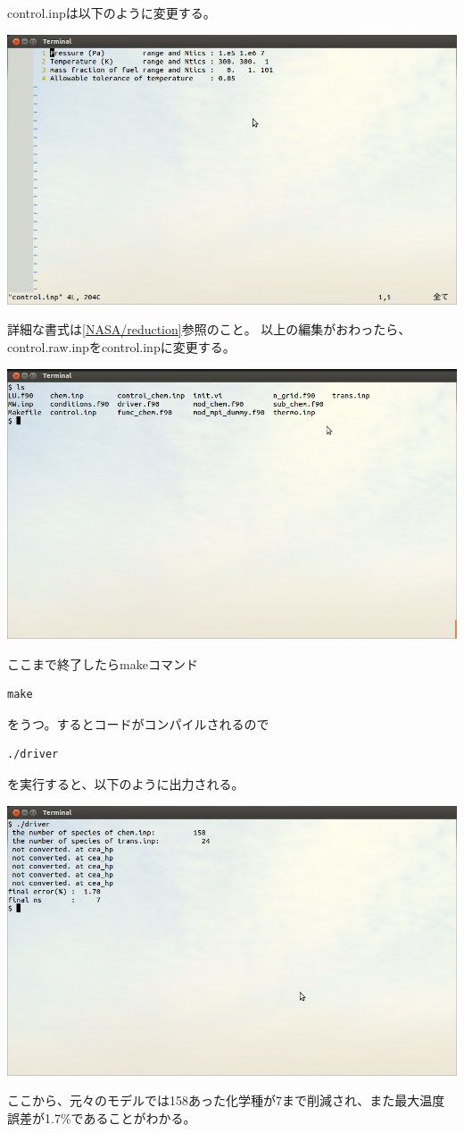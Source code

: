 \documentclass{jsarticle}
\begin{document}
control.inpは以下のように変更する。
\begin{center}
\includegraphics[width=.8\textwidth,bb=0 0 962 577]{tutorial_img/095.png}
\end{center}
詳細な書式は\ref{NASA/reduction}参照のこと。
以上の編集がおわったら、control.raw.inpをcontrol.inpに変更する。
\begin{center}
\includegraphics[width=.8\textwidth,bb=0 0 962 577]{tutorial_img/100.png}
\end{center}
ここまで終了したらmakeコマンド
\begin{verbatim}
make
\end{verbatim}
をうつ。するとコードがコンパイルされるので
\begin{verbatim}
./driver
\end{verbatim}
を実行すると、以下のように出力される。
\begin{center}
\includegraphics[width=.8\textwidth,bb=0 0 962 577]{tutorial_img/110.png}
\end{center}
ここから、元々のモデルでは158あった化学種が7まで削減され、また最大温度誤差が1.7\%であることがわかる。
\end{document}
